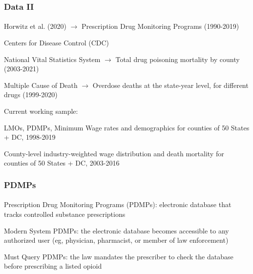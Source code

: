 \begin{frame}

    \frametitle{Data II} %
    \framesubtitle{}  %
    \rmfamily %

    \begin{wideitemize}
        \item \textcolor{fgre}{Horwitz et al. (2020)} \(\to\) Prescription Drug Monitoring Programs (1990-2019)
        \item \textcolor{fgre}{Centers for Disease Control (CDC)} 
        \vspace{9pt}
        \begin{wideitemize}
            \item[\textcolor{fgre}{\textbullet}] \textcolor{fgre}{National Vital Statistics System} \(\to\) Total drug poisoning mortality by county (2003-2021)
            \item[\textcolor{fgre}{\textbullet}] \textcolor{fgre}{Multiple Cause of Death} \(\to\) Overdose deaths at the state-year level, for different drugs (1999-2020)
        \end{wideitemize}
         
    \end{wideitemize}

    \vspace{9pt}
    Current working sample:
    \vspace{9pt}
    
    \begin{wideitemize}
        \item LMOs, PDMPs, Minimum Wage rates and demographics for counties of 50 States + DC, 1998-2019
        \item County-level industry-weighted wage distribution and death mortality for counties of 50 States + DC, 2003-2016
    \end{wideitemize}

\end{frame}


\begin{frame}

    \frametitle{PDMPs} %
    \framesubtitle{}  %
    \rmfamily %
    
    Prescription Drug Monitoring Programs (\textcolor{fblu}{PDMPs}): electronic database that tracks controlled substance prescriptions
    \vspace{9pt}

    \begin{wideenumerate}
        \item \textcolor{fblu}{Modern System PDMPs}: the electronic database becomes accessible to any authorized user (eg, physician, pharmacist, or member of law enforcement)
        \item \textcolor{fblu}{Must Query PDMPs}: the law mandates the prescriber to check the database before prescribing a listed opioid
    \end{wideenumerate}

    

\end{frame}